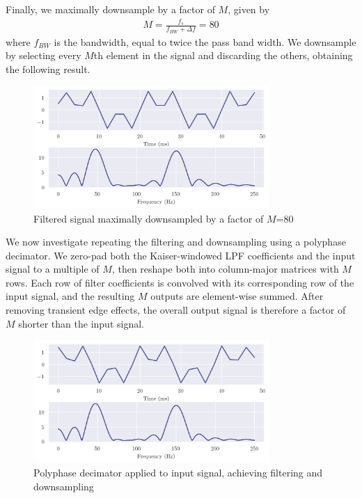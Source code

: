 Finally, we maximally downsample by a factor of $M$, given by
\begin{align}
    M = \frac{f_s}{f_{BW} + \Delta f} = 80
\end{align}
where $f_{BW}$ is the bandwidth, equal to twice the pass band width. We downsample by selecting every $M$th element in the signal and discarding the others, obtaining the following result.

\begin{figure}[ht]
    \centering
    \includegraphics[width=0.8\textwidth]{images/q1_dsamp.png}
    \caption{Filtered signal maximally downsampled by a factor of $M$=80}
    \label{fig:q1_dsamp}
\end{figure}

\newpage

We now investigate repeating the filtering and downsampling using a polyphase decimator. We zero-pad both the Kaiser-windowed LPF coefficients and the input signal to a multiple of $M$, then reshape both into column-major matrices with $M$ rows. Each row of filter coefficients is convolved with its corresponding row of the input signal, and the resulting $M$ outputs are element-wise summed. After removing transient edge effects, the overall output signal is therefore a factor of $M$ shorter than the input signal.

\begin{figure}[ht]
    \centering
    \includegraphics[width=0.8\textwidth]{images/q1_polydecimate.png}
    \caption{Polyphase decimator applied to input signal, achieving filtering and downsampling}
    \label{fig:q1_polydecimate}
\end{figure}

